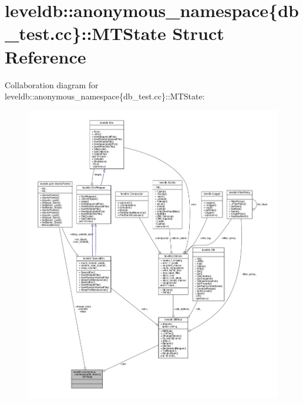 \hypertarget{structleveldb_1_1anonymous__namespace_02db__test_8cc_03_1_1_m_t_state}{}\section{leveldb\+:\+:anonymous\+\_\+namespace\{db\+\_\+test.\+cc\}\+:\+:M\+T\+State Struct Reference}
\label{structleveldb_1_1anonymous__namespace_02db__test_8cc_03_1_1_m_t_state}


Collaboration diagram for leveldb\+:\+:anonymous\+\_\+namespace\{db\+\_\+test.\+cc\}\+:\+:M\+T\+State\+:
\nopagebreak
\begin{figure}[H]
\begin{center}
\leavevmode
\includegraphics[width=350pt]{structleveldb_1_1anonymous__namespace_02db__test_8cc_03_1_1_m_t_state__coll__graph}
\end{center}
\end{figure}
